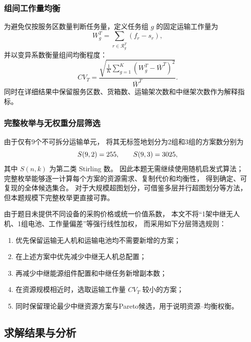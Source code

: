 \subsubsection{组间工作量均衡}

为避免仅按服务区数量判断任务量，定义任务组 $g$ 的固定运输工作量为
\begin{equation}
	W_g^T=\sum_{r\in\mathcal R_g^T}(f_r-s_r),
	\label{eq:q4-workload}
\end{equation}
并以变异系数衡量组间均衡程度：
\begin{equation}
	CV_T=\frac{
		\sqrt{\frac{1}{K}\sum_{g=1}^{K}(W_g^T-\bar W^T)^2}
	}{\bar W^T}.
	\label{eq:q4-cv}
\end{equation}
同时在详细结果中保留服务区数、货箱数、运输架次数和中继架次数作为解释指标。

\subsubsection{完整枚举与无权重分层筛选}

由于仅有9个不可拆分运输单元，
将其无标签地划分为2组和3组的方案数分别为
\begin{equation}
	S(9,2)=255,
	\qquad
	S(9,3)=3025,
	\label{eq:q4-stirling}
\end{equation}
其中 $S(n,k)$ 为第二类 Stirling 数。
因此本题无需继续使用随机启发式算法；
完整枚举能够逐一计算每个方案的资源需求、复制代价和均衡性，
得到确定、可复现的全体候选集合。
对于大规模超图划分，可借鉴多层并行超图划分等方法\cite{q4-krause2025}，
但本题规模下完整枚举更直接可靠。

由于题目未提供不同设备的采购价格或统一价值系数，
本文不将“1架中继无人机、1组电池、工作量偏差”等强行线性加权，
而采用如下分层筛选规则：
\begin{enumerate}[label=(\arabic*),leftmargin=3em]
	\item 优先保留运输无人机和运输电池均不需要新增的方案；
	\item 在上述方案中优先减少中继无人机总配置；
	\item 再减少中继能源组件配置和中继任务新增副本数；
	\item 在资源规模相近时，选取运输工作量 $CV_T$ 较小的方案；
	\item 同时保留理论最少中继资源方案与Pareto候选，用于说明资源--均衡权衡。
\end{enumerate}

\subsection{求解结果与分析}

